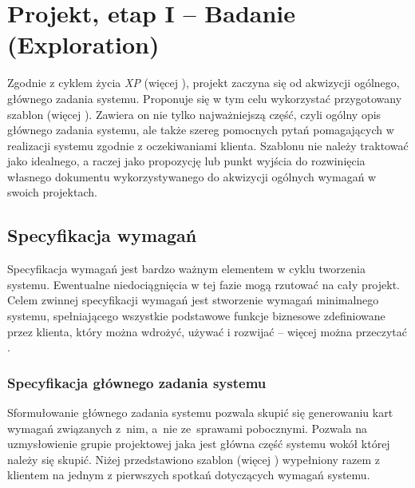 \chapter{Projekt, etap I -- Badanie (Exploration)}
\label{cha:EtapI}

Zgodnie z cyklem życia \textit{XP} (więcej ), projekt zaczyna się od akwizycji ogólnego, głównego zadania systemu. Proponuje się w tym celu wykorzystać przygotowany szablon (więcej ). Zawiera on nie tylko najważniejszą część, czyli ogólny opis głównego zadania systemu, ale także szereg pomocnych pytań pomagających w realizacji systemu zgodnie z oczekiwaniami klienta. Szablonu nie należy traktować jako idealnego, a raczej jako propozycję lub punkt wyjścia do rozwinięcia własnego dokumentu wykorzystywanego do akwizycji ogólnych wymagań w swoich projektach.

\section{Specyfikacja wymagań}
\label{sec:EtapIsw}

Specyfikacja wymagań jest bardzo ważnym elementem w cyklu tworzenia systemu. Ewentualne niedociągnięcia w tej fazie mogą rzutować na cały projekt. Celem zwinnej specyfikacji wymagań jest stworzenie wymagań minimalnego systemu, spełniającego wszystkie podstawowe funkcje biznesowe zdefiniowane przez klienta, który można wdrożyć, używać i rozwijać -- więcej można przeczytać .

\subsection{Specyfikacja głównego zadania systemu}
\label{sec:EtapIswSGZS}

Sformułowanie głównego zadania systemu pozwala skupić się generowaniu kart wymagań związanych z~nim, a~nie ze~sprawami pobocznymi. Pozwala na uzmysłowienie grupie projektowej jaka jest główna część systemu wokół której należy się skupić. Niżej przedstawiono szablon (więcej ) wypełniony razem z klientem na jednym z pierwszych spotkań dotyczących wymagań systemu. 

